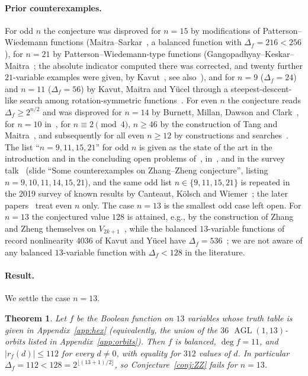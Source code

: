 \documentclass[11pt]{article}
\numberwithin{equation}{section}
\newtheorem{theorem}{Theorem}[section]
\theoremstyle{definition}
\theoremstyle{remark}
\DeclareMathOperator{\AGL}{AGL}
\begin{document}
\paragraph{Prior counterexamples.} For odd $n$ the conjecture was disproved for $n=15$ by
modifications of Patterson--Wiedemann functions (Maitra--Sarkar~\cite{MS02}, a balanced function with
$\Delta_f=216<256$), for $n=21$ by Patterson--Wiedemann-type functions (Gangopadhyay--Keskar--Maitra~\cite{GKM06}; the
absolute indicator computed there was corrected, and twenty further $21$-variable examples were given, by
Kavut~\cite{Kav16}, see also~\cite{Tang18}), and for $n=9$ ($\Delta_f=24$) and
$n=11$ ($\Delta_f=56$) by Kavut, Maitra and Y\"ucel through a steepest-descent-like search among
rotation-symmetric functions~\cite{KMY06,KMY07}. For even $n$ the conjecture reads $\Delta_f\ge2^{n/2}$
and was disproved for $n=14$ by Burnett, Millan, Dawson and Clark~\cite{BMDC04}, for $n=10$
in~\cite{KMY07}, for $n\equiv 2\pmod 4$, $n\ge 46$ by the construction of Tang and Maitra~\cite{TM16}, and
subsequently for all even $n\ge 12$ by constructions and searches~\cite{KMT19,ZPW21,OKK23}.
The list ``$n=9,11,15,21$'' for odd $n$ is given as the state of the art in the introduction and in the
concluding open problems of~\cite{TM16}, in~\cite[Sec.~1]{KMY07}, and in the survey talk~\cite{Tang18}
(slide ``Some counterexamples on Zhang--Zheng conjecture'', listing $n=9,10,11,14,15,21$), and the same
odd list $n\in\{9,11,15,21\}$ is repeated in the 2019 survey of known results by Canteaut, K\"olsch and
Wiemer~\cite[Sec.~5]{CKW19}; the later papers~\cite{KMT19,ZPW21,OKK23} treat even $n$ only. The case
$n=13$ is the smallest odd case left open. For $n=13$ the conjectured value $128$ is attained, e.g., by the
construction of Zhang and Zheng themselves on $V_{2k+1}$~\cite[Theorem~17]{ZZ95}, while the balanced
$13$-variable functions of record nonlinearity $4036$ of Kavut and Y\"ucel have $\Delta_f=536$~\cite[Appendix~B]{KY07};
we are not aware of any balanced $13$-variable function with $\Delta_f<128$ in the literature.

\paragraph{Result.} We settle the case $n=13$.

\begin{theorem}\label{thm:main}
Let $f$ be the Boolean function on $13$ variables whose truth table is given in Appendix~\ref{app:hex}
(equivalently, the union of the $36$ $\AGL(1,13)$-orbits listed in Appendix~\ref{app:orbits}). Then $f$ is
balanced, $\deg f=11$, and $|r_f(d)|\le 112$ for every $d\neq 0$, with equality for $312$ values of $d$.
In particular $\Delta_f=112<128=2^{\lfloor(13+1)/2\rfloor}$, so Conjecture~\ref{conj:ZZ} fails for $n=13$.
\end{theorem}
\end{document}
